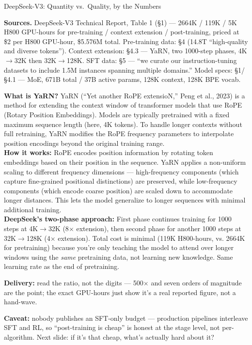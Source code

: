 \documentclass[aspectratio=169]{beamer}
\begin{document}
\begin{frame}{DeepSeek-V3: Quantity vs.\ Quality, by the Numbers}
{    \textbf{Sources.} DeepSeek-V3 Technical Report, Table 1 (\S1) --- 2664K / 119K / 5K H800 GPU-hours
    for pre-training / context extension / post-training, priced at \$2 per H800 GPU-hour, \$5.576M
    total. Pre-training data: \S4 (14.8T ``high-quality and diverse tokens''). Context extension:
    \S4.3 --- YaRN, two 1000-step phases, 4K$\to$32K then 32K$\to$128K. SFT data: \S5 --- ``we
    curate our instruction-tuning datasets to include 1.5M instances spanning multiple domains.''
    Model specs: \S1/\S4.1 --- MoE, 671B total / 37B active params, 128K context, 128K BPE vocab.

    \textbf{What is YaRN?} YaRN (``Yet another RoPE extensioN,'' Peng et al., 2023) is a method for extending the context window of transformer models that use RoPE (Rotary Position Embeddings). Models are typically pretrained with a fixed maximum sequence length (here, 4K tokens). To handle longer contexts without full retraining, YaRN modifies the RoPE frequency parameters to interpolate position encodings beyond the original training range.\\[3pt]
    \textbf{How it works:} RoPE encodes position information by rotating token embeddings based on their position in the sequence. YaRN applies a non-uniform scaling to different frequency dimensions --- high-frequency components (which capture fine-grained positional distinctions) are preserved, while low-frequency components (which encode coarse position) are scaled down to accommodate longer distances. This lets the model generalize to longer sequences with minimal additional training.\\[3pt]
    \textbf{DeepSeek's two-phase approach:} First phase continues training for 1000 steps at 4K$\to$32K (8$\times$ extension), then second phase for another 1000 steps at 32K$\to$128K (4$\times$ extension). Total cost is minimal (119K H800-hours, vs. 2664K for pretraining) because you're only teaching the model to attend over longer windows using the \emph{same} pretraining data, not learning new knowledge. Same learning rate as the end of pretraining.

    \textbf{Delivery:} read the ratio, not the digits --- 500$\times$ and seven orders of magnitude
    are the point; the exact GPU-hours just show it's a real reported figure, not a hand-wave.

    \textbf{Caveat:} nobody publishes an SFT-only budget --- production pipelines interleave SFT
    and RL, so ``post-training is cheap'' is honest at the stage level, not per-algorithm. Next
    slide: if it's that cheap, what's actually hard about it?
  }
\end{frame}
\end{document}
